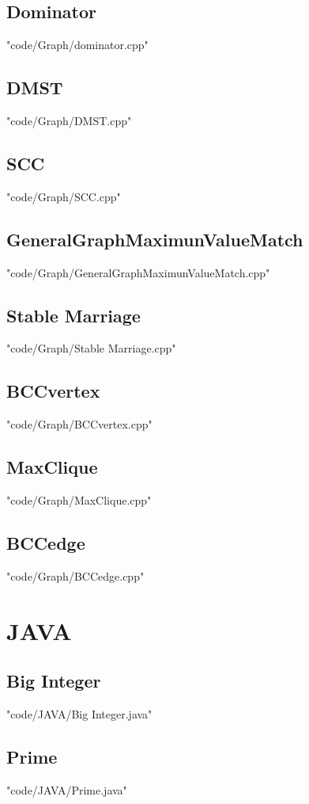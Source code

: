 \documentclass [8pt,a4paper,twocolumn]{article}
\begin{document}
\subsection{Dominator}
 {"code/Graph/dominator.cpp"}
\subsection{DMST}
 {"code/Graph/DMST.cpp"}
\subsection{SCC}
 {"code/Graph/SCC.cpp"}
\subsection{GeneralGraphMaximunValueMatch}
 {"code/Graph/GeneralGraphMaximunValueMatch.cpp"}
\subsection{Stable Marriage}
 {"code/Graph/Stable Marriage.cpp"}
\subsection{BCCvertex}
 {"code/Graph/BCCvertex.cpp"}
\subsection{MaxClique}
 {"code/Graph/MaxClique.cpp"}
\subsection{BCCedge}
 {"code/Graph/BCCedge.cpp"}
\section{JAVA}
\subsection{Big Integer}
 {"code/JAVA/Big Integer.java"}
\subsection{Prime}
 {"code/JAVA/Prime.java"}
\end{document}
